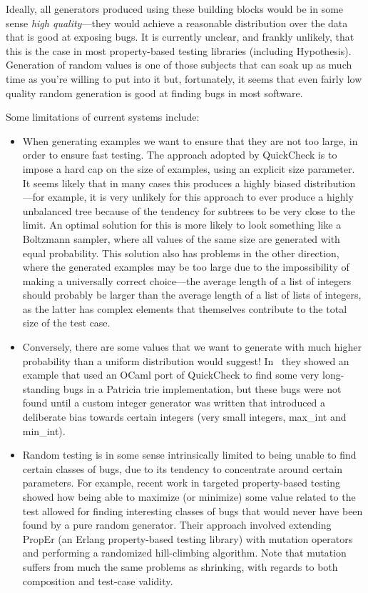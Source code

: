 Ideally,
all generators produced using these building blocks would be in some sense \emph{high quality}---they
would achieve a reasonable distribution over the data that is good at exposing bugs.
It is currently unclear,
and frankly unlikely,
that this is the case in most property-based testing libraries (including Hypothesis).
Generation of random values is one of those subjects that can soak up as much time as you're willing to put into it but,
fortunately,
it seems that even fairly low quality random generation is good at finding bugs in most software. 

Some limitations of current systems include:

\begin{itemize}
\item 
When generating examples we want to ensure that they are not too large,
in order to ensure fast testing.
The approach adopted by QuickCheck is to impose a hard cap on the size of examples,
using an explicit size parameter.
It seems likely that in many cases this produces a highly biased distribution---for example,
it is very unlikely for this approach to ever produce a highly unbalanced tree because of the tendency for subtrees to be very close to the limit.
An optimal solution for this is more likely to look something like a Boltzmann sampler\cite{DBLP:journals/cpc/DuchonFLS04},
where all values of the same size are generated with equal probability.
This solution also has problems in the other direction,
where the generated examples may be too large due to the impossibility of making a universally correct choice---the
average length of a list of integers should probably be larger than the average length of a list of lists of integers,
as the latter has complex elements that themselves contribute to the total size of the test case.
\item
Conversely,
there are some values that we want to generate with much higher probability than a uniform distribution would suggest!
In~\cite{DBLP:conf/sfp/Midtgaard17} they showed an example that used an OCaml port of QuickCheck to find some very long-standing bugs in a Patricia trie implementation,
but these bugs were not found until a custom integer generator was written that introduced a deliberate bias towards certain integers (very small integers, max\_int and min\_int).
\item Random testing is in some sense intrinsically limited to being unable to find certain classes of bugs,
due to its tendency to concentrate around certain parameters.
For example, recent work in targeted property-based testing\cite{DBLP:conf/issta/LoscherS17} showed how being able to maximize (or minimize) some value related to the test allowed for finding interesting classes of bugs that would never have been found by a pure random generator.
Their approach involved extending PropEr (an Erlang property-based testing library) with mutation operators and performing a randomized hill-climbing algorithm.
Note that mutation suffers from much the same problems as shrinking,
with regards to both composition and test-case validity.
\end{itemize}

